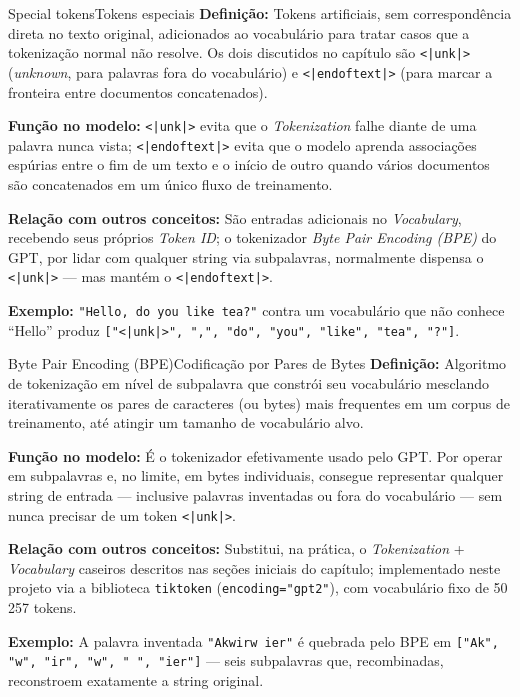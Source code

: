 \documentclass[11pt,a4paper]{article}
\newcommand{\campo}[2]{\textbf{\textcolor{accentblue}{#1:}} #2\par\smallskip}
\begin{document}
\begin{termo}{Special tokens}{Tokens especiais}
\campo{Definição}{Tokens artificiais, sem correspondência direta no texto original,
adicionados ao vocabulário para tratar casos que a tokenização normal não resolve. Os
dois discutidos no capítulo são \texttt{<|unk|>} (\emph{unknown}, para palavras fora do
vocabulário) e \texttt{<|endoftext|>} (para marcar a fronteira entre documentos
concatenados).}
\campo{Função no modelo}{\texttt{<|unk|>} evita que o \emph{Tokenization} falhe
diante de uma palavra nunca vista; \texttt{<|endoftext|>} evita que o modelo aprenda
associações espúrias entre o fim de um texto e o início de outro quando vários
documentos são concatenados em um único fluxo de treinamento.}
\campo{Relação com outros conceitos}{São entradas adicionais no \emph{Vocabulary},
recebendo seus próprios \emph{Token ID}; o tokenizador \emph{Byte Pair Encoding
(BPE)} do GPT, por lidar com qualquer string via subpalavras, normalmente dispensa o
\texttt{<|unk|>} --- mas mantém o \texttt{<|endoftext|>}.}
\campo{Exemplo}{\texttt{"Hello, do you like tea?"} contra um vocabulário que não conhece
``Hello'' produz \texttt{["{}<|unk|>", ",", "do", "you", "like", "tea", "?"]}.}
\end{termo}

\begin{termo}{Byte Pair Encoding (BPE)}{Codificação por Pares de Bytes}
\campo{Definição}{Algoritmo de tokenização em nível de subpalavra que constrói seu
vocabulário mesclando iterativamente os pares de caracteres (ou bytes) mais frequentes
em um corpus de treinamento, até atingir um tamanho de vocabulário alvo.}
\campo{Função no modelo}{É o tokenizador efetivamente usado pelo GPT. Por operar em
subpalavras e, no limite, em bytes individuais, consegue representar qualquer string de
entrada --- inclusive palavras inventadas ou fora do vocabulário --- sem nunca precisar
de um token \texttt{<|unk|>}.}
\campo{Relação com outros conceitos}{Substitui, na prática, o
\emph{Tokenization} + \emph{Vocabulary} caseiros descritos nas seções iniciais
do capítulo; implementado neste projeto via a biblioteca \texttt{tiktoken}
(\texttt{encoding="gpt2"}), com vocabulário fixo de 50\,257 tokens.}
\campo{Exemplo}{A palavra inventada \texttt{"Akwirw ier"} é quebrada pelo BPE em
\texttt{["Ak", "w", "ir", "w", " ", "ier"]} --- seis subpalavras que, recombinadas,
reconstroem exatamente a string original.}
\end{termo}

\clearpage
\end{document}
